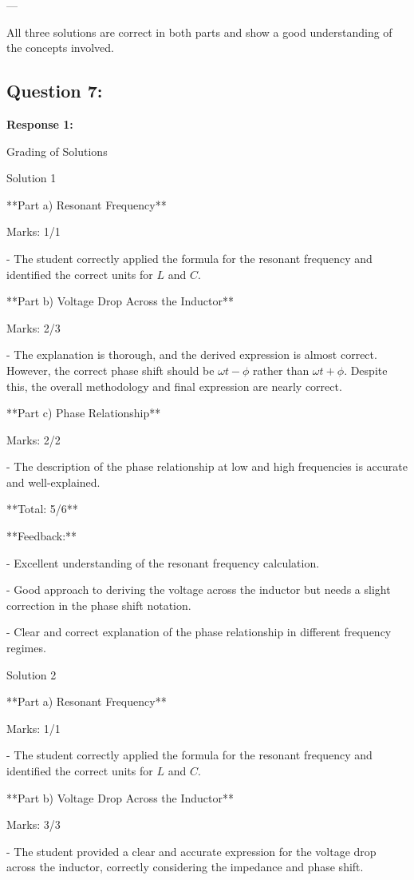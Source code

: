 \documentclass[a4paper,11pt]{article}
\begin{document}
---

All three solutions are correct in both parts and show a good understanding of the concepts involved.

\subsection*{Question 7:}

\textbf{Response 1:}

Grading of Solutions

Solution 1

**Part a) Resonant Frequency**

Marks: 1/1  

- The student correctly applied the formula for the resonant frequency and identified the correct units for \( L \) and \( C \).

**Part b) Voltage Drop Across the Inductor**

Marks: 2/3  

- The explanation is thorough, and the derived expression is almost correct. However, the correct phase shift should be \(\omega t - \phi\) rather than \(\omega t + \phi\). Despite this, the overall methodology and final expression are nearly correct.

**Part c) Phase Relationship**

Marks: 2/2  

- The description of the phase relationship at low and high frequencies is accurate and well-explained.

**Total: 5/6**

**Feedback:** 

- Excellent understanding of the resonant frequency calculation. 

- Good approach to deriving the voltage across the inductor but needs a slight correction in the phase shift notation. 

- Clear and correct explanation of the phase relationship in different frequency regimes.

Solution 2

**Part a) Resonant Frequency**

Marks: 1/1  

- The student correctly applied the formula for the resonant frequency and identified the correct units for \( L \) and \( C \).

**Part b) Voltage Drop Across the Inductor**

Marks: 3/3  

- The student provided a clear and accurate expression for the voltage drop across the inductor, correctly considering the impedance and phase shift.
\end{document}
